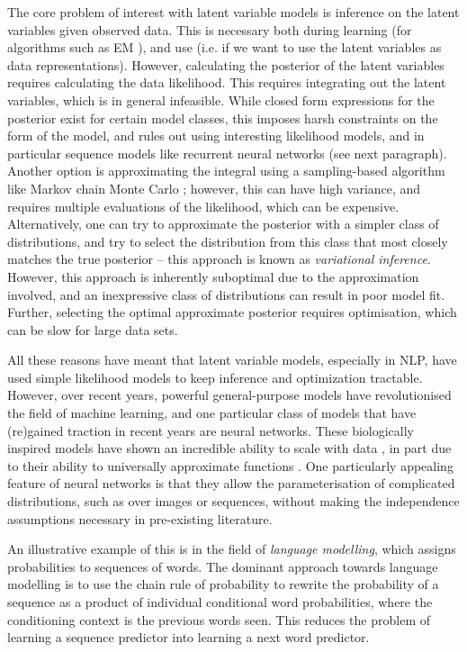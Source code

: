 The core problem of interest with latent variable models is inference on the latent variables given observed data. This is necessary both during learning (for algorithms such as EM \citep{Dempster:77}), and use (i.e. if we want to use the latent variables as data representations). However, calculating the posterior of the latent variables requires calculating the data likelihood. This requires integrating out the latent variables, which is in general infeasible. While closed form expressions for the posterior exist for certain model classes, this imposes harsh constraints on the form of the model, and rules out using interesting likelihood models, and in particular sequence models like recurrent neural networks (see next paragraph). Another option is approximating the integral using a sampling-based algorithm like Markov chain Monte Carlo ; however, this can have high variance, and requires multiple evaluations of the likelihood, which can be expensive. Alternatively, one can try to approximate the posterior with a simpler class of distributions, and try to select the distribution from this class that most closely matches the true posterior -- this approach is known as \textit{variational inference}. However, this approach is inherently suboptimal due to the approximation involved, and an inexpressive class of distributions can result in poor model fit. Further, selecting the optimal approximate posterior requires optimisation, which can be slow for large data sets.

All these reasons have meant that latent variable models, especially in NLP, have used simple likelihood models to keep inference and optimization tractable. However, over recent years, powerful general-purpose models have revolutionised the field of machine learning, and one particular class of models that have (re)gained traction in recent years are neural networks. These biologically inspired models have shown an incredible ability to scale with data \citep{Koehn:17}, in part due to their ability to universally approximate functions \citep{Cybenko:89}. One particularly appealing feature of neural networks is that they allow the parameterisation of complicated distributions, such as over images or sequences, without making the independence assumptions necessary in pre-existing literature.

An illustrative example of this is in the field of \textit{language modelling}, which assigns probabilities to sequences of words. The dominant approach towards language modelling is to use the chain rule of probability to rewrite the probability of a sequence as a product of individual conditional word probabilities, where the conditioning context is the previous words seen. This reduces the problem of learning a sequence predictor into learning a next word predictor.

